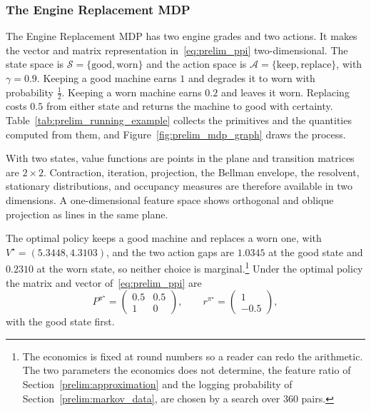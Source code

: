 \FloatBarrier
\subsubsection{The Engine Replacement MDP}

The Engine Replacement MDP has two engine grades and two actions. It makes the vector and matrix representation in~\eqref{eq:prelim_ppi} two-dimensional. The state space is $\mathcal{S} = \{\text{good}, \text{worn}\}$ and the action space is $\mathcal{A} = \{\text{keep}, \text{replace}\}$, with $\gamma = 0.9$. Keeping a good machine earns $1$ and degrades it to worn with probability $\tfrac{1}{2}$. Keeping a worn machine earns $0.2$ and leaves it worn. Replacing costs $0.5$ from either state and returns the machine to good with certainty. Table~\ref{tab:prelim_running_example} collects the primitives and the quantities computed from them, and Figure~\ref{fig:prelim_mdp_graph} draws the process.

With two states, value functions are points in the plane and transition matrices are $2 \times 2$. Contraction, iteration, projection, the Bellman envelope, the resolvent, stationary distributions, and occupancy measures are therefore available in two dimensions. A one-dimensional feature space shows orthogonal and oblique projection as lines in the same plane.

The optimal policy keeps a good machine and replaces a worn one, with $V^\star = (5.3448, 4.3103)$, and the two action gaps are $1.0345$ at the good state and $0.2310$ at the worn state, so neither choice is marginal.\footnote{The economics is fixed at round numbers so a reader can redo the arithmetic. The two parameters the economics does not determine, the feature ratio of Section~\ref{prelim:approximation} and the logging probability of Section~\ref{prelim:markov_data}, are chosen by a search over 360 pairs.} Under the optimal policy the matrix and vector of~\eqref{eq:prelim_ppi} are
\begin{equation}
P^{\pi^\star} = \begin{pmatrix} 0.5 & 0.5 \\ 1 & 0 \end{pmatrix},
\qquad
r^{\pi^\star} = \begin{pmatrix} 1 \\ -0.5 \end{pmatrix},
\label{eq:prelim_running_ppi}
\end{equation}
with the good state first.




